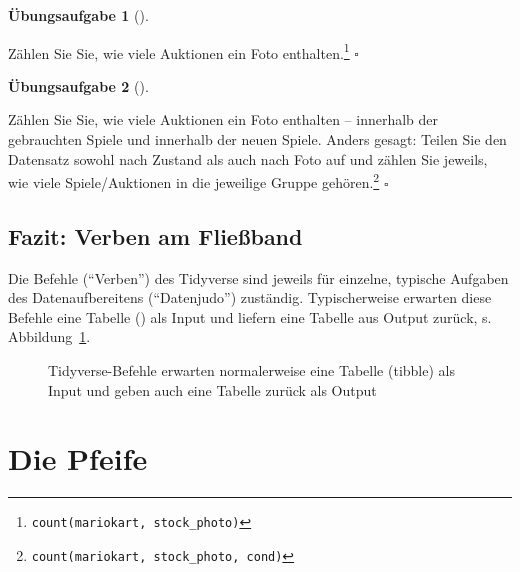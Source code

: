 \documentclass[
  a4paper,
]{scrbook}
\theoremstyle{definition}
\theoremstyle{definition}
\theoremstyle{definition}
\newtheorem{exercise}{Übungsaufgabe}[chapter]
\theoremstyle{remark}
\begin{document}
\begin{exercise}[]\protect\hypertarget{exr-count}{}\label{exr-count}

Zählen Sie Sie, wie viele Auktionen ein Foto enthalten.\footnote{\texttt{count(mariokart,\ stock\_photo)}}
\(\square\)

\end{exercise}

\begin{exercise}[]\protect\hypertarget{exr-count2}{}\label{exr-count2}

Zählen Sie Sie, wie viele Auktionen ein Foto enthalten -- innerhalb der
gebrauchten Spiele und innerhalb der neuen Spiele. Anders gesagt: Teilen
Sie den Datensatz sowohl nach Zustand als auch nach Foto auf und zählen
Sie jeweils, wie viele Spiele/Auktionen in die jeweilige Gruppe
gehören.\footnote{\texttt{count(mariokart,\ stock\_photo,\ cond)}}
\(\square\)

\end{exercise}

\subsection{Fazit: Verben am
Fließband}\label{fazit-verben-am-flieuxdfband}

Die Befehle (``Verben'') des Tidyverse sind jeweils für einzelne,
typische Aufgaben des Datenaufbereitens (``Datenjudo'') zuständig.
Typischerweise erwarten diese Befehle eine Tabelle () als
Input und liefern eine Tabelle aus Output zurück, s.
Abbildung~\ref{fig-tbl-in-out}.

\begin{figure}


\caption{\label{fig-tbl-in-out}Tidyverse-Befehle erwarten normalerweise
eine Tabelle (tibble) als Input und geben auch eine Tabelle zurück als
Output}

\end{figure}%

\section{Die Pfeife}\label{sec-pipe}
\end{document}
